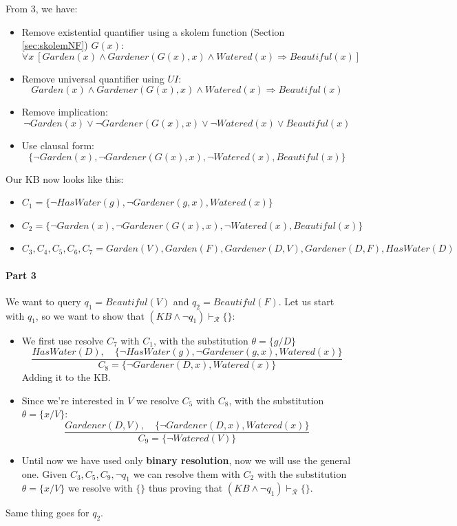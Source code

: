 \documentclass[10pt,a4paper]{article}
\begin{document}
From 3, we have:
\begin{itemize}
\item Remove existential quantifier using a skolem function (Section \ref{sec:skolemNF}) $G(x)$:
\[\forall x\ [Garden(x)\wedge  Gardener(G(x),x) \wedge Watered(x)\Rightarrow Beautiful(x)]\]
\item Remove universal quantifier using $UI$:
\[Garden(x)\wedge  Gardener(G(x),x) \wedge Watered(x)\Rightarrow Beautiful(x)\]
\item Remove implication:
\[\neg Garden(x)\vee \neg Gardener(G(x),x) \vee \neg Watered(x)\vee Beautiful(x)\]
\item Use clausal form:
\[\lbrace \neg Garden(x), \neg Gardener(G(x),x) , \neg Watered(x), Beautiful(x)\rbrace\]
\end{itemize}

Our KB now looks like this:
\begin{itemize}
\item $C_1=\lbrace \neg HasWater(g), \neg Gardener(g,x), Watered(x)\rbrace$
\item $C_2=\lbrace \neg Garden(x), \neg Gardener(G(x),x) , \neg Watered(x), Beautiful(x)\rbrace$
\item $C_3,C_4,C_5,C_6,C_7=Garden(V), Garden(F), Gardener(D,V), Gardener(D,F), HasWater(D)$
\end{itemize}



\paragraph{Part 3}
We want to query $q_1=Beautiful(V)$ and $q_2=Beautiful(F)$. Let us start with $q_1$, so we want to show that $(KB \wedge \neg q_1)\vdash_{\mathcal{R}} \{\}$:
\begin{itemize}
\item We first use resolve $C_7$ with $C_1$, with the substitution $\theta=\{g/D\}$
\[\frac{ HasWater(D),\quad \lbrace \neg HasWater(g), \neg Gardener(g,x), Watered(x)\rbrace}{C_8=\lbrace \neg Gardener(D,x), Watered(x)\rbrace}\]
Adding it to the KB.
\item Since we're interested in $V$ we resolve $C_5$  with $C_8$, with the substitution $\theta=\{x/V\}$:
\[\frac{Gardener(D,V),\quad \lbrace \neg Gardener(D,x), Watered(x)\rbrace}{C_9=\lbrace \neg Watered(V)\rbrace}\]
\item Until now we have used only \textbf{binary resolution}, now we will use the general one. Given $C_3,C_5,C_9,\neg q_1$ we can resolve them with $C_2$ with the substitution $\theta=\{x/V\}$ we resolve with $\{\}$ thus proving that $(KB \wedge \neg q_1)\vdash_{\mathcal{R}} \{\}$.
\end{itemize}
Same thing goes for $q_2$.
\end{document}
